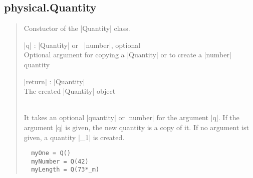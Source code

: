 \documentclass{ltxdoc}
\begin{document}
\subsection{physical.Quantity}



\begin{quote}
  Constuctor of the |Quantity| class.

  \subtitle{Parameters}
  \begin{description}
    \item |q| : |Quantity| or \ |number|, optional\\
      Optional argument for copying a |Quantity| or to create a |number| quantity

    \item |return| : |Quantity|\\
    The created |Quantity| object
  \end{description}

  \subtitle{Notes}\\
  It takes an optional |quantity| or |number| for the argument |q|. If the argument |q| is given, the new quantity is a copy of it. If no argument ist given, a quantity |_1| is created.

  \subtitle{Examples}
  \begin{lstlisting}
  myOne = Q()
  myNumber = Q(42)
  myLength = Q(73*_m)
  \end{lstlisting}
\end{quote}
\end{document}
